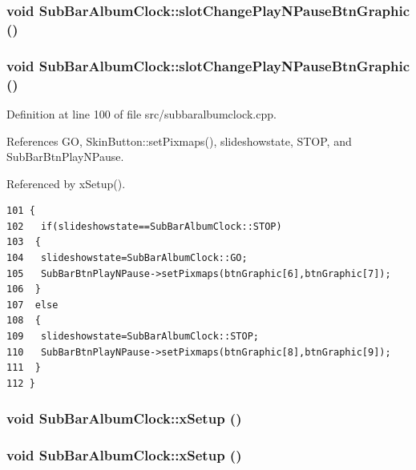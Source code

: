 \subsubsection{\setlength{\rightskip}{0pt plus 5cm}void Sub\-Bar\-Album\-Clock::slot\-Change\-Play\-NPause\-Btn\-Graphic ()\hspace{0.3cm}{\tt  [slot]}}\label{classSubBarAlbumClock_SubBarAlbumClocki3}


\subsubsection{\setlength{\rightskip}{0pt plus 5cm}void Sub\-Bar\-Album\-Clock::slot\-Change\-Play\-NPause\-Btn\-Graphic ()\hspace{0.3cm}{\tt  [slot]}}\label{classSubBarAlbumClock_SubBarAlbumClocki1}




Definition at line 100 of file src/subbaralbumclock.cpp.

References GO, Skin\-Button::set\-Pixmaps(), slideshowstate, STOP, and Sub\-Bar\-Btn\-Play\-NPause.

Referenced by x\-Setup().



\footnotesize\begin{verbatim}101 {
102   if(slideshowstate==SubBarAlbumClock::STOP)
103  {
104   slideshowstate=SubBarAlbumClock::GO;
105   SubBarBtnPlayNPause->setPixmaps(btnGraphic[6],btnGraphic[7]);
106  }
107  else
108  {
109   slideshowstate=SubBarAlbumClock::STOP;
110   SubBarBtnPlayNPause->setPixmaps(btnGraphic[8],btnGraphic[9]);
111  }
112 }
\end{verbatim}\normalsize 
{}
\subsubsection{\setlength{\rightskip}{0pt plus 5cm}void Sub\-Bar\-Album\-Clock::x\-Setup ()}\label{classSubBarAlbumClock_SubBarAlbumClocka5}


\subsubsection{\setlength{\rightskip}{0pt plus 5cm}void Sub\-Bar\-Album\-Clock::x\-Setup ()}\label{classSubBarAlbumClock_SubBarAlbumClocka2}




